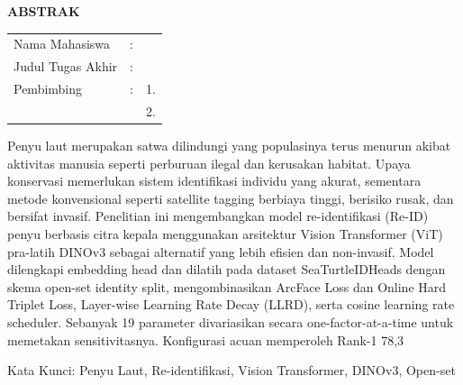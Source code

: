 \begin{center}
  \large\textbf{ABSTRAK}
\end{center}


\vspace{2ex}

\begingroup
\setlength{\tabcolsep}{0pt}

\noindent
\begin{tabularx}{\textwidth}{l >{\centering}m{2em} X}
  Nama Mahasiswa    & : & \name{}         \\

  Judul Tugas Akhir & : & \tatitle{}      \\

  Pembimbing        & : & 1. \advisor{}   \\
                    &   & 2. \coadvisor{} \\
\end{tabularx}
\endgroup

Penyu laut merupakan satwa dilindungi yang populasinya terus menurun akibat aktivitas manusia seperti perburuan ilegal dan kerusakan habitat. Upaya konservasi memerlukan sistem identifikasi individu yang akurat, sementara metode konvensional seperti satellite tagging berbiaya tinggi, berisiko rusak, dan bersifat invasif. Penelitian ini mengembangkan model re-identifikasi (Re-ID) penyu berbasis citra kepala menggunakan arsitektur Vision Transformer (ViT) pra-latih DINOv3 sebagai alternatif yang lebih efisien dan non-invasif. Model dilengkapi embedding head dan dilatih pada dataset SeaTurtleIDHeads dengan skema open-set identity split, mengombinasikan ArcFace Loss dan Online Hard Triplet Loss, Layer-wise Learning Rate Decay (LLRD), serta cosine learning rate scheduler. Sebanyak 19 parameter divariasikan secara one-factor-at-a-time untuk memetakan sensitivitasnya. Konfigurasi acuan memperoleh Rank-1 78,3%

Kata Kunci: Penyu Laut, Re-identifikasi, Vision Transformer, DINOv3, Open-set

